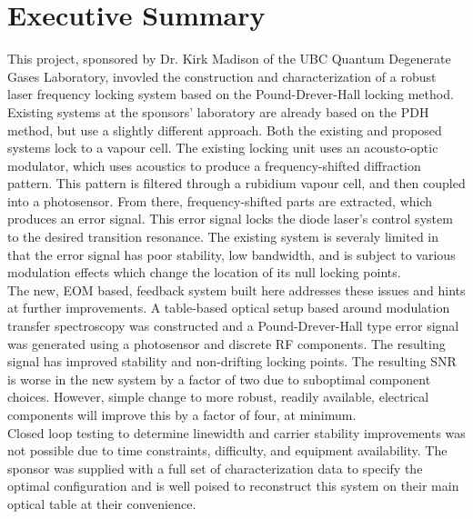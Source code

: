 \newpage
\section*{Executive Summary}

This project, sponsored by Dr. Kirk Madison of the UBC Quantum Degenerate Gases Laboratory, invovled the construction and characterization of a robust laser frequency locking system based on the Pound-Drever-Hall locking method. \\

Existing systems at the sponsors' laboratory are already based on the PDH method, but use a slightly different approach.  Both the existing and proposed systems lock to a vapour cell.  The existing locking unit uses an acousto-optic modulator, which uses acoustics to produce a frequency-shifted diffraction pattern.  This pattern is filtered through a rubidium vapour cell, and then coupled into a photosensor.  From there, frequency-shifted parts are extracted, which produces an error signal.  This error signal locks the diode laser's control system to the desired transition resonance. The existing system is severaly limited in that the error signal has poor stability, low bandwidth, and is subject to various modulation effects which change the location of its null locking points. \\

The new, EOM based, feedback system built here addresses these issues and hints at further improvements. A table-based optical setup based around modulation transfer spectroscopy was constructed and a Pound-Drever-Hall type error signal was generated using a photosensor and discrete RF components. The resulting signal has improved stability and non-drifting locking points. The resulting SNR is worse in the new system by a factor of two due to suboptimal component choices. However, simple change to more robust, readily available, electrical components will improve this by a factor of four, at minimum. \\

Closed loop testing to determine linewidth and carrier stability improvements was not possible due to time constraints, difficulty, and equipment availability. The sponsor was supplied with a full set of characterization data to specify the optimal configuration and is well poised to reconstruct this system on their main optical table at their convenience.

